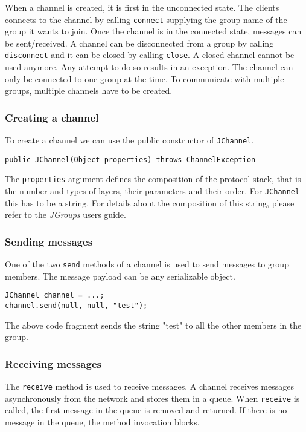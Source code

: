 When a channel is created, it is first in the unconnected state. The clients connects to the channel by calling \texttt{connect} supplying the group name of the group it wants to join. Once the channel is in the connected state, messages can be sent/received. A channel can be disconnected from a group by calling \texttt{disconnect} and it can be closed by calling \texttt{close}. A closed channel cannot be used anymore. Any attempt to do so results in an exception. The channel can only be connected to one group at the time. To communicate with multiple groups, multiple channels have to be created.

\subsubsection{Creating a channel}
To create a channel we can use the public constructor of \texttt{JChannel}. 

\begin{verbatim}
public JChannel(Object properties) throws ChannelException
\end{verbatim}

The \texttt{properties} argument defines the composition of the protocol stack, that is the number and types of layers, their parameters and their order. For \texttt{JChannel} this has to be a string. For details about the composition of this string, please refer to the \emph{JGroups} users guide.

\subsubsection{Sending messages}
One of the two \texttt{send} methods of a channel is used to send messages to group members. The message payload can be any serializable object.

\begin{verbatim}
JChannel channel = ...;
channel.send(null, null, "test");
\end{verbatim}

The above code fragment sends the string "test" to all the other members in the group.

\subsubsection{Receiving messages}
The \texttt{receive} method is used to receive messages. A channel receives messages asynchronously from the network and stores them in a queue. When \texttt{receive} is called, the first message in the queue is removed and returned. If there is no message in the queue, the method invocation blocks.

